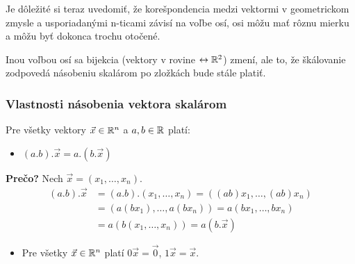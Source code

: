 Je dôležité si teraz uvedomiť, že korešpondencia medzi vektormi v geometrickom zmysle
a usporiadanými n-ticami závisí na voľbe osí, osi môžu mať rôznu mierku a môžu byť
dokonca trochu otočené.
\begin{center}
\end{center}
Inou voľbou osí sa bijekcia (vektory v rovine $\leftrightarrow \mathbb{R}^2$) zmení, ale to, že škálovanie zodpovedá násobeniu skalárom po zložkách bude stále platiť.

\subsubsection{Vlastnosti násobenia vektora skalárom}
Pre všetky vektory $\vec{x} \in \mathbb{R}^n$ a $a,b \in \mathbb{R}$ platí:
\begin{itemize}
    \item $(a . b) . \vec{x} = a . (b . \vec{x})$
\end{itemize}
\textbf{Prečo?} Nech $\vec{x}=(x_1, \dots, x_n)$.
\begin{align*}
(a . b) . \vec{x} &= (a . b) . (x_1, \dots, x_n) = ((ab)x_1, \dots, (ab)x_n) \\
&= (a(bx_1), \dots, a(bx_n)) = a(bx_1, \dots, bx_n) \\
&= a(b(x_1, \dots, x_n)) = a(b . \vec{x})
\end{align*}
\begin{itemize}
    \item Pre všetky $\vec{x} \in \mathbb{R}^n$ platí $0\vec{x} = \vec{0}$, $1\vec{x} = \vec{x}$.
\end{itemize}



